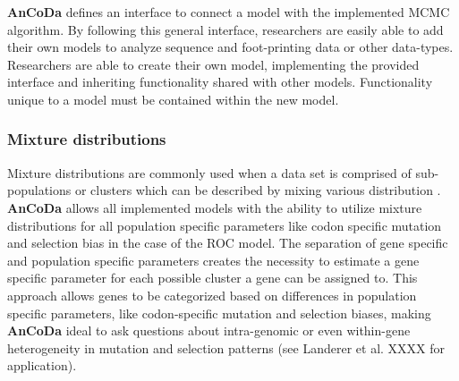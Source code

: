 \documentclass{bioinfo}
\newcommand{\package}{\textbf{AnCoDa }} %
\begin{document}

\package defines an interface to connect a model with the implemented MCMC algorithm. 
By following this general interface, researchers are easily able to add their own models to analyze sequence and foot-printing data or other data-types.
Researchers are able to create their own model, implementing the provided interface and inheriting functionality shared with other models.
Functionality unique to a model must be contained within the new model. 

\subsubsection*{Mixture distributions}
Mixture distributions are commonly used when a data set is comprised of sub-populations or clusters which can be described by mixing various distribution \citep{gelman2013}. 
\package allows all implemented models with the ability to utilize mixture distributions for all population specific parameters like codon specific mutation and selection bias in the case of the ROC model. 
The separation of gene specific and population specific parameters creates the necessity to estimate a gene specific parameter for each possible cluster a gene can be assigned to. 
This approach allows genes to be categorized based on differences in population specific parameters, like codon-specific mutation and selection biases, making \package ideal to ask questions about intra-genomic or even within-gene heterogeneity in mutation and selection patterns (see Landerer et al. XXXX for application). 
\end{document}
